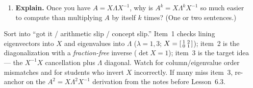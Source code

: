 \documentclass[10pt]{article}
\begin{document}
\begin{enumerate}[leftmargin=1.8em, itemsep=14pt]
  \item \textbf{Explain.} Once you have $A=X\Lambda X^{-1}$, why is $A^{k}=X\Lambda^{k}X^{-1}$ so much easier
        to compute than multiplying $A$ by itself $k$ times? (One or two sentences.)
\end{enumerate}

\begin{teachernote}
Sort into ``got it / arithmetic slip / concept slip.'' Item~1 checks lining eigenvectors into $X$ and
eigenvalues into $\Lambda$ ($\lambda=1,3$; $X=\begin{bsmallmatrix}1&2\\0&1\end{bsmallmatrix}$); item~2 is the
diagonalization with a \emph{fraction-free} inverse ($\det X=1$); item~3 is the target idea --- the
$X^{-1}X$ cancellation plus $\Lambda$ diagonal. Watch for column/eigenvalue order mismatches and for
students who invert $X$ incorrectly. If many miss item~3, re-anchor on the $A^2=X\Lambda^2X^{-1}$
derivation from the notes before Lesson~6.3.
\end{teachernote}
\end{document}
